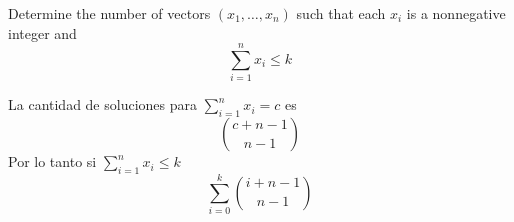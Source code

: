 \item Determine the number of vectors $(x_1,\dots,x_n)$ such that each $x_i$ is a nonnegative integer and
\[ \sum_{i=1}^n x_i \le k \]

La cantidad de soluciones para $\displaystyle \sum_{i=1}^n x_i = c$ es
\[ \binom{c+n-1}{n-1} \]
Por lo tanto si $\displaystyle \sum_{i=1}^n x_i \le k$
\[ \sum_{i=0}^k \binom{i+n-1}{n-1} \]